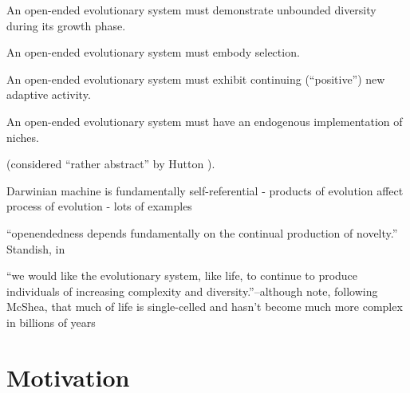 \begin{NOTES}
\begin{compactitem}
	\item An open-ended evolutionary system must demonstrate unbounded diversity during its growth phase.
	\item An open-ended evolutionary system must embody selection.
	\item An open-ended evolutionary system must exhibit continuing (``positive'') new adaptive activity.
	\item An open-ended evolutionary system must have an endogenous implementation of niches.
\end{compactitem} \cite{Maley1999} (considered ``rather abstract'' by Hutton \parencite[p.341]{Hutton2002}).

Darwinian machine is fundamentally self-referential - products of evolution affect process of evolution - lots of examples \parencite{Watson2015}

``openendedness depends fundamentally on the continual production of novelty.'' Standish, in \parencite{Soros2014}

``we would like the evolutionary system, like life, to continue to produce individuals of increasing complexity and diversity.''--although note, following McShea, that much of life is single-celled and hasn't become much more complex in billions of years \parencite{Maley1999}

\end{NOTES}

\section{Motivation}\label{motivation}


